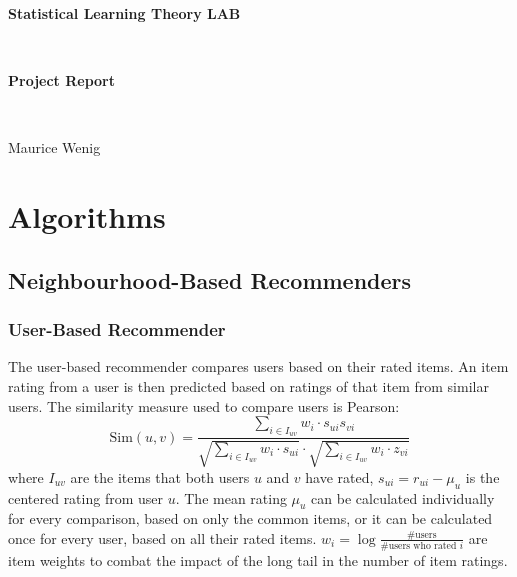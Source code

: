 \documentclass[11pt]{scrartcl}
\begin{document}
\thispagestyle{empty}
\begin{center}
	\begin{LARGE}
		\textbf{Statistical Learning Theory LAB}
	\end{LARGE}\vspace{3mm}\\
	\begin{Large}
		\textbf{Project Report}
	\end{Large}\vspace{5mm}\\
	\begin{large}
		Maurice Wenig
	\end{large}
\end{center}
\tableofcontents
\clearpage


\fancyhead[LO,RE]{\itshape\nouppercase\leftmark}
\section{Algorithms}
\subsection[Neighbourhood]{Neighbourhood-Based Recommenders}
\subsubsection[User-Based]{User-Based Recommender}
The user-based recommender compares users based on their rated items. An item rating from a user is then predicted based on ratings of that item from similar users.
The similarity measure used to compare users is Pearson:
$$\text{Sim}(u, v) = \frac{\sum\limits_{i\in I_{uv}} w_i \cdot s_{ui} s_{vi}}{\sqrt{\sum\limits_{i\in I_{uv}} w_i \cdot  s_{ui}} \cdot \sqrt{\sum\limits_{i\in I_{uv}} w_i \cdot  z_{vi}}}$$
where $I_{uv}$ are the items that both users $u$ and $v$ have rated, $s_{ui} = r_{ui} - \mu_u$ is the centered rating from user $u$.
The mean rating $\mu_u$ can be calculated individually for every comparison, based on only the common items, or it can be calculated once for every user, based on all their rated items.
$w_i = \log\frac{\text{\# users}}{\text{\# users who rated } i}$ are item weights to combat the impact of the long tail in the number of item ratings.
\end{document}
